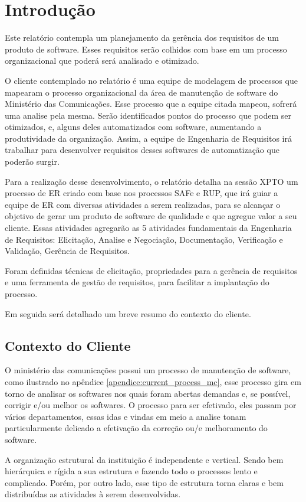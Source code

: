 \chapter[Introdução]{Introdução}\label{cap1}


Este relatório contempla um planejamento da gerência dos requisitos de um produto de software. Esses requisitos serão colhidos com base em um processo organizacional que poderá será analisado e otimizado.

O cliente contemplado no relatório é uma equipe de modelagem de processos  que mapearam o processo organizacional da área de manutenção de software do Ministério das Comunicações. Esse processo que a equipe citada mapeou, sofrerá uma analise pela mesma. Serão identificados pontos do processo que podem ser otimizados, e, alguns deles automatizados com software, aumentando a produtividade da organização. Assim, a equipe de Engenharia de Requisitos irá trabalhar para desenvolver requisitos desses softwares de automatização que poderão surgir.

Para a realização desse desenvolvimento, o relatório detalha na sessão XPTO um processo de ER criado com base nos processos SAFe e RUP, que irá guiar a equipe de ER com diversas atividades a serem realizadas, para se alcançar o objetivo de gerar um produto de software de qualidade e que agregue valor a seu cliente. Essas atividades agregarão as 5 atividades fundamentais da Engenharia de Requisitos: Elicitação, Analise e Negociação, Documentação, Verificação e Validação, Gerência de Requisitos.

Foram definidas técnicas de elicitação, propriedades para a gerência de requisitos e uma ferramenta de gestão de requisitos, para facilitar a implantação do processo.

Em seguida será detalhado um breve resumo do contexto do cliente.

\section[Contexto do Cliente]{Contexto do Cliente}\label{contexto_cliente}
O ministério das comunicações possui um processo de manutenção de software, como ilustrado no apêndice \ref{apendice:current_process_mc}, esse
processo gira em torno de analisar os softwares nos quais foram abertas demandas
e, se possível, corrigir e/ou melhor os softwares. O processo para ser efetivado, eles passam por vários departamentos, essas idas e vindas
em meio a analise tonam particularmente delicado a efetivação da correção ou/e melhoramento do software.

A organização estrutural da instituição é independente e vertical. Sendo bem hierárquica
e rígida a sua estrutura e fazendo todo o processos lento e complicado. Porém, por
outro lado, esse tipo de estrutura torna claras e bem distribuídas as atividades à serem desenvolvidas.
